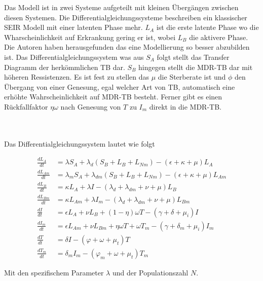 \documentclass[paper=a4, fontsize=11pt, ngerman, abstract=on]{scrartcl}
\numberwithin{equation}{section} %
\numberwithin{figure}{section} %
\numberwithin{table}{section} %
\begin{document}
\begin{minipage}{0.55\linewidth}
  Das Modell ist in zwei Systeme aufgeteilt mit kleinen Übergängen zwischen diesen Systemen. Die Differentialgleichungssysteme beschreiben ein klassischer SEIR Modell mit einer latenten Phase mehr. $L_{A}$ ist die erste latente Phase wo die Wharscheinlichkeit auf Erkrankung gering er ist, wobei $L_{B}$ die aktivere Phase. Die Autoren haben herausgefunden das eine Modellierung so besser abzubilden ist. Das Differentialgleichungssystem was aus $S_{A}$ folgt stellt das Transfer Diagramm der herkömmlichen TB dar. $S_{B}$ hingegen stellt die MDR-TB dar mit höheren Ressistenzen. Es ist fest zu stellen das $\mu$ die Sterberate ist und $\phi$ den Übergang von einer Genesung, egal welcher Art von TB, automatisch eine erhöhte Wahrscheinlichkeit auf MDR-TB besteht. Ferner gibt es einen Rückfallfaktor $\eta \omega$ nach Genesung von $T$ zu $I_{m}$ direkt in die MDR-TB.
\end{minipage}\\\\

Das Differentialgleichungssystem lautet wie folgt

\begin{equation}
\begin{split}
  \frac{dL_{A}}{dt} &= \lambda S_{A} + \lambda_{d}(S_{B} + L_{B} + L_{Nm}) - (\epsilon + \kappa + \mu)L_{A} \\
  \frac{dL_{Am}}{dt} &= \lambda_{m} S_{A} + \lambda_{dm}(S_{B} + L_{B} + L_{Nm}) - (\epsilon + \kappa + \mu)L_{Am} \\
  \frac{dL_{B}}{dt} &= \kappa L_{A} + \lambda I - (\lambda_{d} + \lambda_{dm} + \nu + \mu) L_{B} \\
  \frac{dL_{Bm}}{dt} &= \kappa L_{Am} + \lambda I_{m} - (\lambda_{d} + \lambda _{dm} + \nu + \mu) L_{Bm} \\
  \frac{dI}{dt} &= \epsilon L_{A} + \nu L_{B} + (1 - \eta)\omega T - (\gamma + \delta + \mu_{i})I \\
  \frac{dI_{m}}{dt} &= \epsilon L_{Am} + \nu L_{Bm} + \eta \omega T + \omega T_{m} - (\gamma + \delta_{m} + \mu_{i})I_{m} \\
  \frac{dT}{dt} &= \delta I - (\varphi + \omega + \mu_{t}) T \\
  \frac{dT_{m}}{dt} &= \delta _{m} I_{m} - (\varphi _{m} + \omega + \mu_{t}) T_{m}
\end{split}
\label{eq:dgls-mdr-tb}
\end{equation}

Mit den spezifischem Parameter $\lambda$ und der Populationszahl $N$.
\end{document}
